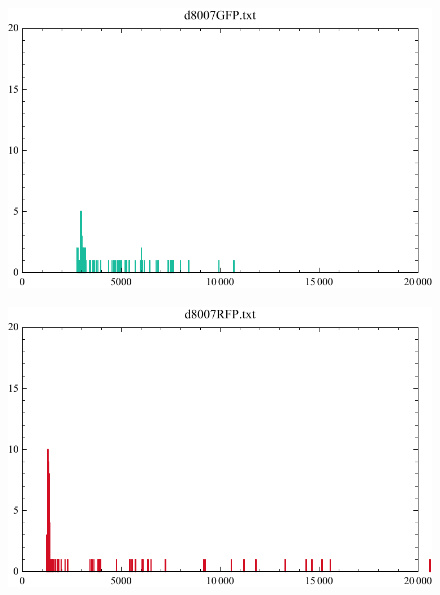 \documentclass[english,11pt,a4paper]{article}
\begin{document}
\begin{figure}[h]
\centering
	\begin{minipage}{.5\textwidth}
  		\centering
  		\includegraphics[width=.9\linewidth]{d8007GFP.pdf}
  		\label{fig:onc1GFPAfterHours}
	\end{minipage}%
	\begin{minipage}{.5\textwidth}
  		\centering
  		\includegraphics[width=.9\linewidth]{d8007RFP.pdf}
  		\label{fig:onc1RFPAfterHours}  
	\end{minipage}
\end{figure}
\end{document}

